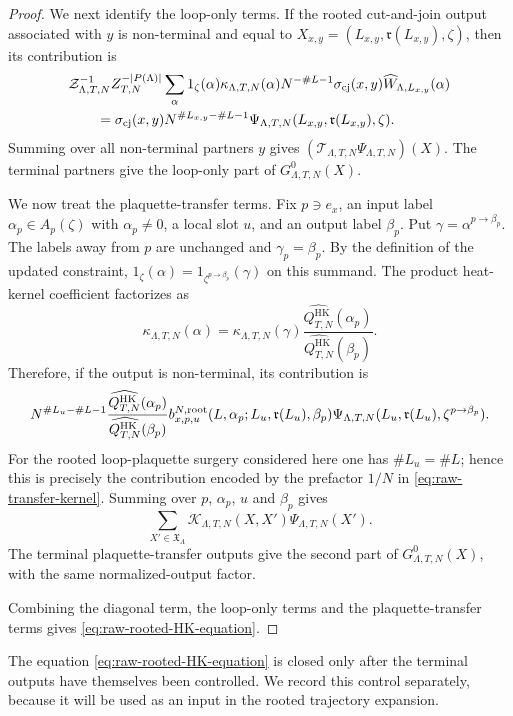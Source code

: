 \documentclass[11pt,a4paper,reqno]{amsart}
\theoremstyle{definition}
\theoremstyle{remark}
\newcommand\HK{{\mathrm{HK}}}
\begin{document}
\begin{proof}
We next identify the loop-only terms.  If the rooted cut-and-join output associated with $y$ is non-terminal and equal to $X_{x,y}=(L_{x,y},\mathfrak r(L_{x,y}),\zeta)$, then its contribution is
\[
\begin{aligned}
&\mathcal Z_{\Lambda,T,N}^{-1} Z_{T,N}^{-|P(\Lambda)|}
\sum_\alpha
1_\zeta(\alpha)\kappa_{\Lambda,T,N}(\alpha)
N^{-\#L-1}\sigma_{\rm cj}(x,y)
\widehat W_{\Lambda,L_{x,y}}(\alpha)
\\
&\qquad=
\sigma_{\rm cj}(x,y)N^{\#L_{x,y}-\#L-1}
\Psi_{\Lambda,T,N}(L_{x,y},\mathfrak r(L_{x,y}),\zeta).
\end{aligned}
\]
Summing over all non-terminal partners $y$ gives $(\mathcal T_{\Lambda,T,N}\Psi_{\Lambda,T,N})(X)$.  The terminal partners give the loop-only part of $G^0_{\Lambda,T,N}(X)$.

We now treat the plaquette-transfer terms.  Fix $p\ni e_x$, an input label $\alpha_p\in A_p(\zeta)$ with $\alpha_p\ne0$, a local slot $u$, and an output label $\beta_p$.  Put $\gamma=\alpha^{p\to\beta_p}.$ The labels away from $p$ are unchanged and $\gamma_p=\beta_p$.  By the definition of the updated constraint, $1_\zeta(\alpha)=1_{\zeta^{p\to\beta_p}}(\gamma)$ on this summand.
The product heat-kernel coefficient factorizes as
\[
\kappa_{\Lambda,T,N}(\alpha)=\kappa_{\Lambda,T,N}(\gamma)\frac{\widehat{Q_{T,N}^\HK}(\alpha_p)}{\widehat{Q_{T,N}^\HK}(\beta_p)}.
\]
Therefore, if the output is non-terminal, its contribution is
\[
N^{\#L_u-\#L-1}\frac{\widehat{Q_{T,N}^\HK}(\alpha_p)}{\widehat{Q_{T,N}^\HK}(\beta_p)} b^{N,{\rm root}}_{x,p,u}(L,\alpha_p;L_u,\mathfrak r(L_u),\beta_p)\Psi_{\Lambda,T,N}(L_u,\mathfrak r(L_u),\zeta^{p\to\beta_p}).
\]
For the rooted loop-plaquette surgery considered here one has $\#L_u=\#L$; hence this is precisely the contribution encoded by the prefactor $1/N$ in \eqref{eq:raw-transfer-kernel}.  Summing over $p$, $\alpha_p$, $u$ and $\beta_p$ gives
\[
\sum_{X'\in\mathfrak X_\Lambda}\mathcal K_{\Lambda,T,N}(X,X')\Psi_{\Lambda,T,N}(X').
\]
The terminal plaquette-transfer outputs give the second part of $G^0_{\Lambda,T,N}(X)$, with the same normalized-output factor.

Combining the diagonal term, the loop-only terms and the plaquette-transfer terms gives \eqref{eq:raw-rooted-HK-equation}.
\end{proof}

The equation \eqref{eq:raw-rooted-HK-equation} is closed only after the terminal outputs have themselves been controlled. We record this control separately, because it will be used as an input in the rooted trajectory expansion.
\end{document}
